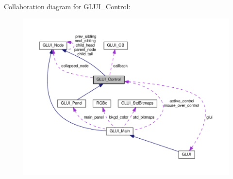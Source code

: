 Collaboration diagram for G\+L\+U\+I\+\_\+\+Control\+:\nopagebreak
\begin{figure}[H]
\begin{center}
\leavevmode
\includegraphics[width=350pt]{class_g_l_u_i___control__coll__graph}
\end{center}
\end{figure}
